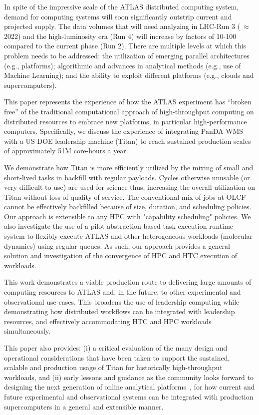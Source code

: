 In spite of the impressive scale of the ATLAS distributed computing system,
demand for computing systems will soon significantly outstrip current and
projected supply.   The data volumes that will need analyzing in LHC-Run 3 
($~\approx$ 2022) and the high-luminosity era (Run 4) will increase by factors
of 10-100 compared to the current phase (Run 2). There are multiple levels at
which this problem needs to be addressed: the utilization of emerging parallel
architectures (e.g., platforms); algorithmic and advances in analytical
methods (e.g., use of Machine Learning); and the ability to exploit different
platforms (e.g., clouds and supercomputers).


This paper represents the experience of how the ATLAS experiment has ``broken
free'' of the traditional computational approach of high-throughput computing
on distributed resources to embrace new platforms, in particular  
high-performance computers. Specifically, we discuss the experience of integrating
PanDA WMS with a US DOE leadership machine (Titan) to reach
sustained production scales of approximately 51M core-hours a year. 

We demonstrate how Titan is more efficiently utilized by the mixing of small
and short-lived tasks in backfill with regular payloads. Cycles otherwise
unusable (or very difficult to use) are used for science thus, increasing the
overall utilization on Titan without loss of quality-of-service. The
conventional mix of jobs at OLCF cannot be effectively backfilled because of
size, duration, and scheduling policies. Our approach is extensible to any HPC
with "capability scheduling" policies.  We also investigate the use of a
pilot-abstraction based task execution runtime system to flexibly execute
ATLAS and other heterogeneous workloads (molecular dynamics) using regular
queues. As such, our approach provides a general solution and investigation of
the convergence of HPC and HTC execution of workloads.

This work demonstrates a viable production route to delivering large amounts
of computing resources to ATLAS and, in the future, to other experimental and
observational use cases.  This broadens the use of leadership computing while
demonstrating how distributed workflows can be integrated with leadership
resources, and effectively accommodating HTC and HPC workloads simultaneously. 

This paper also provides: (i) a critical evaluation of the many design and
operational considerations that have been taken to support the sustained,
scalable and production usage of Titan for historically high-throughput
workloads, and (ii) early lessons and guidance as the community looks forward
to designing the next generation of online analytical platforms~\cite{foap-
url}, for how current and future experimental and observational systems can be
integrated with production supercomputers in a general and extensible manner.
